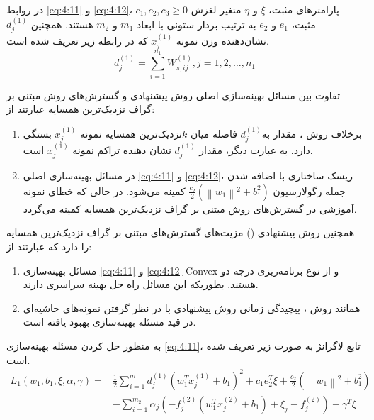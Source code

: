 در روابط \ref{eq:4:11} و  \ref{eq:4:12}،  $c_{1},c_{2},c_{3} \geq 0$ پارامترهای مثبت، $\xi $ و  $\eta$ متغیر لغزش مثبت،    $e_{1}$ و  $e_{2}$ به ترتیب بردار ستونی با ابعاد  $m_{1}$ و $m_{2}$  هستند. همچنین  $d^{(1)}_{j}$ نشان‌دهنده وزن نمونه   $x^{(1)}_{j}$ که در رابطه زیر تعریف شده است.
\begin{equation}\label{eq:4:13}
d^{(1)}_{j}=\sum^{n_1}_{i=1} W^{(1)}_{s,ij},j=1,2,\dots,n_1
\end{equation}

تفاوت بین مسائل بهینه‌سازی اصلی روش پیشنهادی و گسترش‌های روش  مبتنی بر گراف نزدیک‌ترین همسایه عبارتند از:

\begin{enumerate}
	\item برخلاف روش ، مقدار   به$d^{(1)}_{j}$ فاصله میان  $k$نزدیک‌ترین همسایه نمونه  $x^{(1)}_{j}$ بستگی دارد. به عبارت دیگر، مقدار  $d^{(1)}_{j}$ نشان دهنده تراکم نمونه $x^{(1)}_{j}$  است.
	\item در مسائل بهینه‌سازی اصلی  \ref{eq:4:11} و \ref{eq:4:12}، ریسک ساختاری با اضافه شدن جمله رگولارسیون   $\frac{c_{2}}{2}(\left\|w_{1}\right\|^{2}+b^{2}_{1})$ کمینه می‌شود. در حالی که خطای نمونه آموزشی در گسترش‌های روش  مبتنی بر گراف نزدیک‌ترین همسایه کمینه می‌گردد.
\end{enumerate}

همچنین روش پیشنهادی () مزیت‌های گسترش‌های مبتنی بر گراف نزدیک‌ترین همسایه را دارد که عبارتند از:
\begin{enumerate}
	\item مسائل بهینه‌سازی \ref{eq:4:11} و \ref{eq:4:12} \gls{Convex} و از نوع برنامه‌ریزی درجه دو هستند. بطوریکه این مسائل راه حل بهینه سراسری دارند.
	\item همانند روش ، پیچیدگی زمانی روش پیشنهادی با در نظر گرفتن نمونه‌های حاشیه‌ای در قید مسئله بهینه‌سازی بهبود یافته است.
\end{enumerate}

به منظور حل کردن مسئله بهینه‌سازی \ref{eq:4:11}، تابع لاگرانژ به صورت زیر تعریف شده است.
\begin{equation}
\begin{split}
L_{1}(w_{1},b_{1},\xi, \alpha, \gamma)= &\frac{1}{2}\sum\limits_{i=1}^{m_{1}}{d^{(1)}_{j}(w^{T}_{1}x^{(1)}_{j}+b_{1})^{2}}+c_{1}e_{2}^{T}\xi+\frac{c_{2}}{2}(\left\|w_{1}\right\|^{2}+b^{2}_{1}) \\
& -\sum\limits_{i=1}^{m_{2}}{\alpha_{j}(-f^{(2)}_{j}(w^{T}_{1}x^{(2)}_{j}+b_{1})+\xi_{j} - f^{(2)}_{j})} - \gamma^{T}\xi
\end{split}
\label{eq:4:14}
\end{equation}

